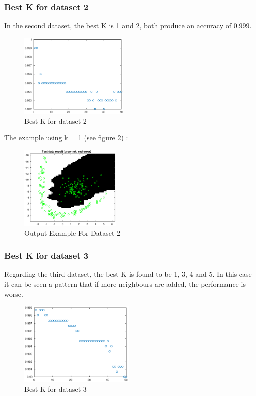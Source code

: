 \documentclass{article}
\begin{document}
\subsubsection {Best K for dataset 2}
In the second dataset, the best K is 1 and 2, both produce an accuracy of 0.999.

\begin{figure}[!htb]
\centering
\includegraphics[height=4cm]{images/bestkdataset2}
\caption{Best K for dataset 2}
\label{fig:bestkdataset2}
\end{figure}

The example using k = 1 (see figure \ref{fig:resultsknn2}) :

\begin{figure}[!htb]
\centering
\includegraphics[height=4cm]{images/resultsknn2}
\caption{Output Example For Dataset 2}
\label{fig:resultsknn2}
\end{figure}


\subsubsection {Best K for dataset 3}
Regarding the third dataset, the best K is found to be 1, 3, 4 and 5. In this case it can be seen a pattern that if more neighbours are added, the performance is worse.

\begin{figure}[!htb]
\centering
\includegraphics[height=4cm]{images/bestkdataset3}
\caption{Best K for dataset 3}
\label{fig:bestkdataset3}
\end{figure}
\end{document}
